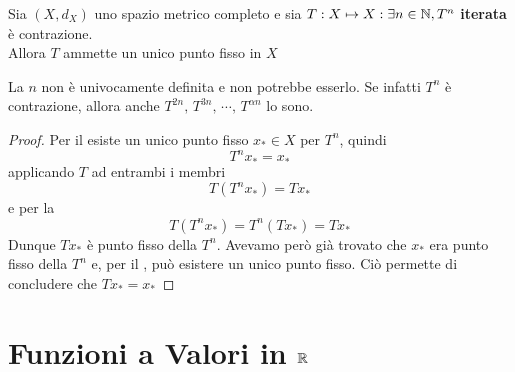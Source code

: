 \begin{theorem}
	\label{teo:iterata_contraz}
	Sia $(X,d_X)$ uno spazio metrico completo e sia $T:X\mapsto X : \exists n \in \mathbb{N}, T^n$ \textbf{iterata} è contrazione.\\
	Allora $T$ ammette un unico punto fisso in $X$
	\begin{note}
		La $n$ non è univocamente definita e non potrebbe esserlo. Se infatti $T^n$ è contrazione, allora anche $T^{2n},\, T^{3n},\, \cdots,\, T^{\alpha n}$ lo sono.
	\end{note}
	\begin{proof}
		Per il  esiste un unico punto fisso $x_* \in X$ per $T^n$, quindi
		$$T^nx_* = x_*$$
		applicando $T$ ad entrambi i membri
		$$T(T^{n}x_*) = Tx_*$$
		e per la 
		$$T(T^{n}x_*) = T^n(Tx_*) = Tx_*$$
		Dunque $Tx_*$ è punto fisso della $T^n$. Avevamo però già trovato che $x_*$ era punto fisso della $T^n$ e, per il , può esistere un unico punto fisso. Ciò permette di concludere che $Tx_* = x_*$
	\end{proof}
\end{theorem}

\section{Funzioni a Valori in \texorpdfstring{$\protect \mathbb{R}$}{R}}
